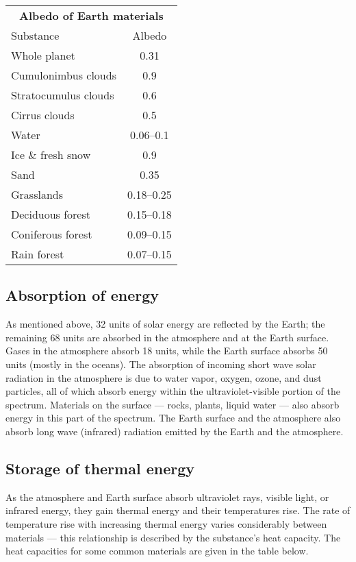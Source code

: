 \documentclass[11pt,letterpaper]{article}
\begin{document}
\begin{table}[h]
\begin{tabular}{lc}
\multicolumn{2}{c}{\textbf{Albedo of Earth materials}}\\
Substance & Albedo\\
\hline
Whole planet & 0.31\\
Cumulonimbus clouds & 0.9\\
Stratocumulus clouds & 0.6\\
Cirrus clouds & 0.5\\
Water & 0.06--0.1\\
Ice $\&$ fresh snow & 0.9\\
Sand & 0.35\\
Grasslands & 0.18--0.25\\
Deciduous forest & 0.15--0.18\\
Coniferous forest & 0.09--0.15\\
Rain forest & 0.07--0.15\\
\hline
\end{tabular}
\end{table}

\subsection{Absorption of energy}
As mentioned above, 32 units of solar energy are reflected by the Earth; the remaining 68 units are absorbed in the atmosphere and at the Earth surface. Gases in the atmosphere absorb 18 units, while the Earth surface absorbs 50 units (mostly in the oceans). The absorption of incoming short wave solar radiation in the atmosphere is due to water vapor, oxygen, ozone, and dust particles, all of which absorb energy within the ultraviolet-visible portion of the spectrum. Materials on the surface --- rocks, plants, liquid water --- also absorb energy in this part of the spectrum. The Earth surface and the atmosphere also absorb long wave (infrared) radiation emitted by the Earth and the atmosphere.

\subsection{Storage of thermal energy}
As the atmosphere and Earth surface absorb ultraviolet rays, visible light, or infrared energy, they gain thermal energy and their
temperatures rise. The rate of temperature rise with increasing thermal energy varies considerably between materials --- this relationship is
described by the substance's heat capacity. The heat capacities for some common materials are given in the table
below.
\end{document}
